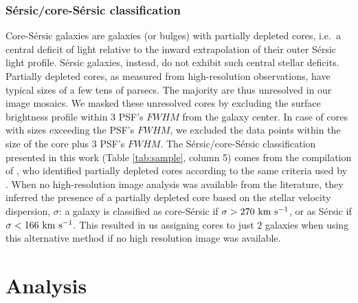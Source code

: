 \documentclass[preprint2]{emulateapj}
\begin{document}
\subsubsection{S\'ersic/core-S\'ersic classification}
\label{sec:corser}
Core-S\'ersic galaxies \citep{grahamguzman2003,graham2003coresersicmodel,trujillo2004coresersicmodel} are galaxies (or bulges) 
with partially depleted cores, 
i.e.~a central deficit of light relative to the inward extrapolation of their outer S\'ersic light profile. 
S\'ersic galaxies, instead, do not exhibit such central stellar deficits.
Partially depleted cores, as measured from high-resolution observations, have typical sizes of a few tens of parsecs.
The majority are thus unresolved in our image mosaics. 
We masked these unresolved cores by excluding the surface brightness profile 
within 3 PSF's $FWHM$ from the galaxy center.
In case of cores with sizes exceeding the PSF's $FWHM$, we excluded the data points within the size of the core 
plus 3 PSF's $FWHM$.
The S\'ersic/core-S\'ersic classification presented in this work (Table \ref{tab:sample}, column 5)
comes from the compilation of \citet{savorgnangraham2014},
who identified partially depleted cores according to the same criteria used by \citet{grahamscott2013}.
When no high-resolution image analysis was available from the literature, 
they inferred the presence of a partially depleted core based on the stellar velocity dispersion, $\sigma$:
a galaxy is classified as core-S\'ersic if $\sigma > 270\rm~km~s^{-1}$,
or as S\'ersic if $\sigma < 166\rm~km~s^{-1}$.
This resulted in us assigning cores to just 2 galaxies when using this alternative method 
if no high resolution image was available.

\section{Analysis}
\label{sec:anal}
\end{document}
